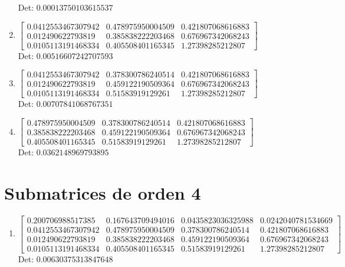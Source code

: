 \documentclass[12pt]{article}
\begin{document}
\begin{enumerate}
Det: $0.00013750103615537$\\

\item $\displaystyle \left[\begin{matrix}0.0412553467307942 & 0.478975950004509 & 0.421807068616883\\0.012490622793819 & 0.385838222203468 & 0.676967342068243\\0.0105113191468334 & 0.405508401165345 & 1.27398285212807\end{matrix}\right]$\\

Det: $0.00516607242707593$\\

\item $\displaystyle \left[\begin{matrix}0.0412553467307942 & 0.378300786240514 & 0.421807068616883\\0.012490622793819 & 0.459122190509364 & 0.676967342068243\\0.0105113191468334 & 0.51583919129261 & 1.27398285212807\end{matrix}\right]$\\

Det: $0.00707841068767351$\\

\item $\displaystyle \left[\begin{matrix}0.478975950004509 & 0.378300786240514 & 0.421807068616883\\0.385838222203468 & 0.459122190509364 & 0.676967342068243\\0.405508401165345 & 0.51583919129261 & 1.27398285212807\end{matrix}\right]$\\

Det: $0.0362148969793895$\\

\end{enumerate}


\section*{Submatrices de orden 4}

\begin{enumerate}

\item $\displaystyle \left[\begin{matrix}0.200706988517385 & 0.167643709494016 & 0.0435823036325988 & 0.0242040781534669\\0.0412553467307942 & 0.478975950004509 & 0.378300786240514 & 0.421807068616883\\0.012490622793819 & 0.385838222203468 & 0.459122190509364 & 0.676967342068243\\0.0105113191468334 & 0.405508401165345 & 0.51583919129261 & 1.27398285212807\end{matrix}\right]$\\

Det: $0.00630375313847648$\\

\end{enumerate}
\end{document}
